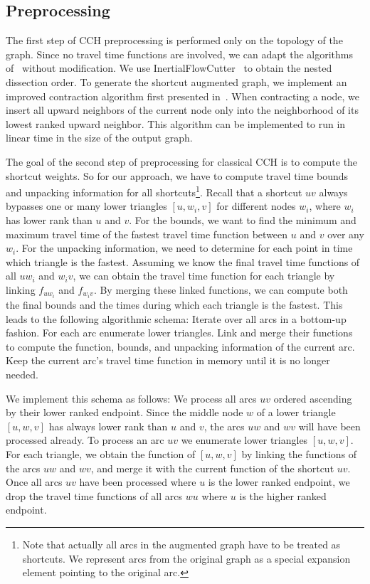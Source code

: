 \documentclass[a4paper,UKenglish,cleveref,autoref]{lipics-v2019}
\begin{document}
\subsection{Preprocessing}

The first step of CCH preprocessing is performed only on the topology of the graph.
Since no travel time functions are involved, we can adapt the algorithms of~\cite{dsw-cch-15} without modification.
We use InertialFlowCutter~\cite{ghuw-fbndocch-19} to obtain the nested dissection order.
To generate the shortcut augmented graph, we implement an improved contraction algorithm first presented in~\cite{z-cchtc-19}.
When contracting a node, we insert all upward neighbors of the current node only into the neighborhood of its lowest ranked upward neighbor.
This algorithm can be implemented to run in linear time in the size of the output graph.

The goal of the second step of preprocessing for classical CCH is to compute the shortcut weights.
So for our approach, we have to compute travel time bounds and unpacking information for all shortcuts\footnote{Note that actually all arcs in the augmented graph have to be treated as shortcuts. We represent arcs from the original graph as a special expansion element pointing to the original arc.}.
Recall that a shortcut $u v$ always bypasses one or many lower triangles $[u,w_i,v]$ for different nodes $w_i$, where $w_i$ has lower rank than $u$ and $v$.
For the bounds, we want to find the minimum and maximum travel time of the fastest travel time function between $u$ and $v$ over any $w_i$.
For the unpacking information, we need to determine for each point in time which triangle is the fastest.
Assuming we know the final travel time functions of all $u w_i$ and $w_i v$, we can obtain the travel time function for each triangle by linking $f_{u w_i}$ and $f_{w_i v}$.
By merging these linked functions, we can compute both the final bounds and the times during which each triangle is the fastest.
This leads to the following algorithmic schema:
Iterate over all arcs in a bottom-up fashion.
For each arc enumerate lower triangles.
Link and merge their functions to compute the function, bounds, and unpacking information of the current arc.
Keep the current arc's travel time function in memory until it is no longer needed.

We implement this schema as follows:
We process all arcs $u v$ ordered ascending by their lower ranked endpoint.
Since the middle node $w$ of a lower triangle $[u,w,v]$ has always lower rank than $u$ and $v$, the arcs $u w$ and $w v$ will have been processed already.
To process an arc $u v$ we enumerate lower triangles $[u,w,v]$.
For each triangle, we obtain the function of $[u,w,v]$ by linking the functions of the arcs $u w$ and $w v$, and merge it with the current function of the shortcut $u v$.
Once all arcs $u v$ have been processed where $u$ is the lower ranked endpoint, we drop the travel time functions of all arcs $w u$ where $u$ is the higher ranked endpoint.
\end{document}
